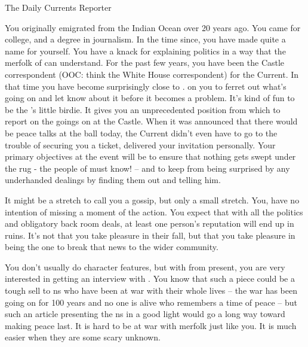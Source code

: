 \documentclass[char]{NeptuneBall}
\begin{document}
\name{\cReporter{}}

The Daily Currents Reporter

You originally emigrated from the Indian Ocean over 20 years ago. You came for college, and a degree in journalism. In the time since, you have made quite a name for yourself. You have a knack for explaining politics in a way that the merfolk of \pAtlantis{} can understand. For the past few years, you have been the Castle correspondent (OOC: think the White House correspondent) for the Current. In that time you have become surprisingly close to \cKing{\King} \cKing{}. \cKing{\They}  on you to ferret out what's going on and let \cKing{\them} know about it before it becomes a problem. It's kind of fun to be the \cKing{\King}'s little birdie. It gives you an unprecedented position from which to report on the goings on at the Castle. When it was announced that there would be peace talks at the ball today, the Current didn't even have to go to the trouble of securing you a ticket, \cKing{\King} \cKing{} delivered your invitation personally.  Your primary objectives at the event will be to ensure that nothing gets swept under the rug - the people of \pAtlantis{} must know! -- and to keep \cKing{\King} \cKing{} from being surprised by any underhanded dealings by finding them out and telling him. 

It might be a stretch to call you a gossip, but only a small stretch. You, have no intention of missing a moment of the action. You expect that with all the politics and obligatory back room deals, at least one person’s reputation will end up in ruins. It's not that you take pleasure in their fall, but that you take pleasure in being the one to break that news to the wider community.

You don't usually do character features, but with \cPrince{\aprince} from \pPacifica{} present, you are very interested in getting an interview with \cPrince{\them}. You know that such a piece could be a tough sell to \pAtlantis{}ns who have been at war with \pPacifica{} their whole lives -- the war has been going on for 100 years and no one is alive who remembers a time of peace -- but such an article presenting the \pPacifica{}ns in a good light would go a long way toward making peace last. It is hard to be at war with merfolk just like you. It is much easier when they are some scary unknown.
\end{document}
